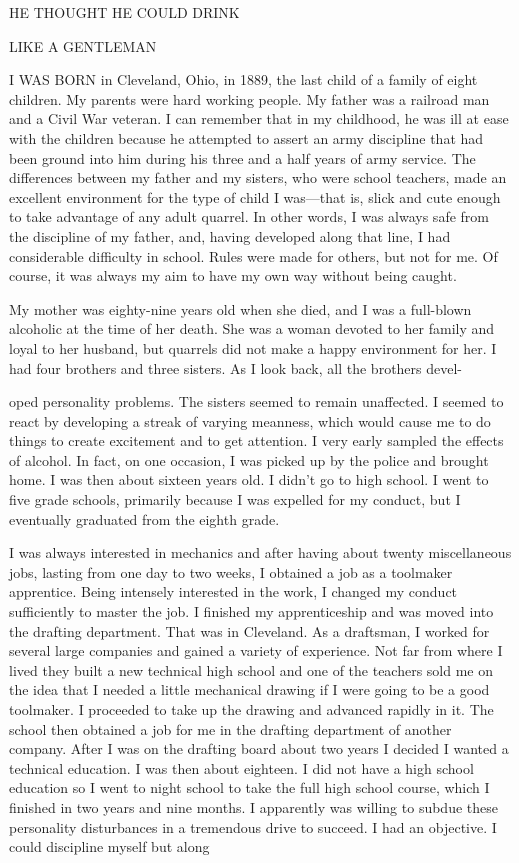
\begin{biblechapter}


HE THOUGHT HE COULD DRINK

LIKE A GENTLEMAN

      I WAS BORN in Cleveland, Ohio, in 1889, the last child of a family of eight children. My parents were hard working people. My father was a railroad man and a Civil War veteran. I can remember that in my childhood, he was ill at ease with the children because he attempted to assert an army discipline that had been ground into him during his three and a half years of army service. The differences between my father and my sisters, who were school teachers, made an excellent environment for the type of child I was—that is, slick and cute enough to take advantage of any adult quarrel. In other words, I was always safe from the discipline of my father, and, having developed along that line, I had considerable difficulty in school. Rules were made for others, but not for me. Of course, it was always my aim to have my own way without being caught.

My mother was eighty-nine years old when she died, and I was a full-blown alcoholic at the time of her death. She was a woman devoted to her family and loyal to her husband, but quarrels did not make a happy environment for her. I had four brothers and three sisters. As I look back, all the brothers devel-

oped personality problems. The sisters seemed to remain unaffected. I seemed to react by developing a streak of varying meanness, which would cause me to do things to create excitement and to get attention. I very early sampled the effects of alcohol. In fact, on one occasion, I was picked up by the police and brought home. I was then about sixteen years old. I didn’t go to high school. I went to five grade schools, primarily because I was expelled for my conduct, but I eventually graduated from the eighth grade.

I was always interested in mechanics and after having about twenty miscellaneous jobs, lasting from one day to two weeks, I obtained a job as a toolmaker apprentice. Being intensely interested in the work, I changed my conduct sufficiently to master the job. I finished my apprenticeship and was moved into the drafting department. That was in Cleveland. As a draftsman, I worked for several large companies and gained a variety of experience. Not far from where I lived they built a new technical high school and one of the teachers sold me on the idea that I needed a little mechanical drawing if I were going to be a good toolmaker. I proceeded to take up the drawing and advanced rapidly in it. The school then obtained a job for me in the drafting department of another company. After I was on the drafting board about two years I decided I wanted a technical education. I was then about eighteen. I did not have a high school education so I went to night school to take the full high school course, which I finished in two years and nine months. I apparently was willing to subdue these personality disturbances in a tremendous drive to succeed. I had an objective. I could discipline myself but along


\end{biblechapter}
